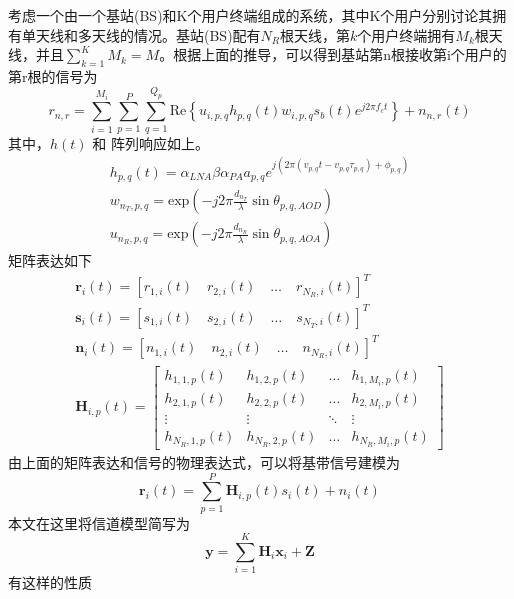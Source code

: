 \documentclass[bachelor,nocolorlinks, printoneside]{seuthesis} %
\begin{document}
\begin{Main}
考虑一个由一个基站(BS)和K个用户终端组成的系统，其中K个用户分别讨论其拥有单天线和多天线的情况。基站(BS)配有$N_R$根天线，第$k$个用户终端拥有$M_k$根天线，并且$\sum_{k=1}^K M_k = M$。根据上面的推导，可以得到基站第n根接收第i个用户的第r根的信号为
\begin{equation}\label{key}
r_{n,r} = \sum^{M_i}_{i=1} \sum_{p=1}^{P} \sum_{q=1}^{Q_p} \mathrm{Re} \left \lbrace u_{i,p,q} h_{p,q} (t) w_{i,p,q} s_b(t) e^{j 2\pi f_c t} \right \rbrace + n_{n,r}(t)
\end{equation}
其中，$h(t)$ 和 阵列响应如上。
\begin{eqnarray}\label{key}
h_{p,q}(t) = \alpha_{LNA}\beta\alpha_{PA}a_{p,q}e^{j(2\pi 
	(v_{p,q}t-v_{p,q}\tau_{p,q})+\phi_{p,q}
	)} \\
w_{n_{T},p,q} = \mathrm{exp}(-j2\pi \frac{d_{n_{T}}}{\lambda}\sin \theta_{p,q,AOD})\\
u_{n_{R},p,q} = \mathrm{exp}(-j2\pi \frac{d_{n_{R}}}{\lambda}\sin \theta_{p,q,AOA})
\end{eqnarray}
矩阵表达如下
\begin{eqnarray}\label{key}
\mathbf{r}_{i}(t) = [r_{1,i}(t) \quad r_{2,i}(t) \quad\dots\quad r_{N_{R},i}(t)]^{T} \\
\mathbf{s}_{i}(t) = [s_{1,i}(t) \quad s_{2,i}(t) \quad\dots\quad s_{N_{T},i}(t)]^{T} \\
\mathbf{n}_{i}(t) = [n_{1,i}(t) \quad n_{2,i}(t) \quad\dots\quad n_{N_{R},i}(t)]^{T} \\
\mathbf{H}_{i,p}(t) = \left[ \begin{array}{cccc}
h_{1,1,p}(t) & h_{1,2,p}(t) & \ldots & h_{1,M_{i},p}(t) \\
h_{2,1,p}(t) & h_{2,2,p}(t) & \ldots & h_{2,M_{i},p}(t) \\
\vdots & \vdots & \ddots & \vdots \\
h_{N_{R},1,p}(t) & h_{N_{R},2,p}(t) & \ldots & h_{N_{R},M_{i},p}(t)
\end{array} \right] 
\end{eqnarray}
由上面的矩阵表达和信号的物理表达式，可以将基带信号建模为
\begin{equation}\label{key}
\mathbf{r}_{i}(t) = \sum_{p=1}^{P}\mathbf{H}_{i,p}(t)s_{i}(t) + n_{i}(t)
\end{equation}
本文在这里将信道模型简写为
\begin{equation}\label{key}
\mathbf{y} = \sum_{i=1}^{K} \mathbf{H}_i \mathbf{x}_i + \mathbf{Z}
\end{equation}
有这样的性质
\begin{equation}\label{key}

\end{equation}
\end{Main}
\end{document}
